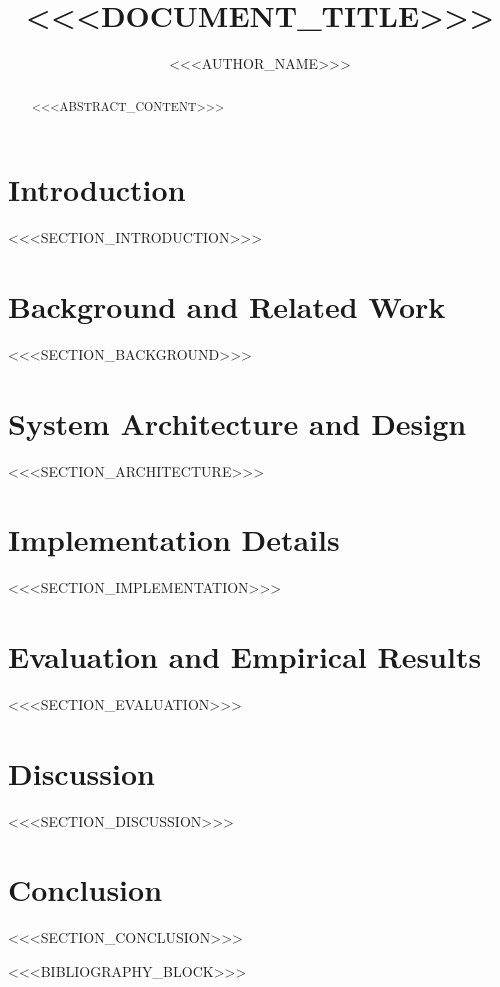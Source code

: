 \documentclass[sigconf,nonacm]{acmart}
\begin{document}
\title{<<<DOCUMENT_TITLE>>>}

\author{<<<AUTHOR_NAME>>>}

\begin{abstract}
<<<ABSTRACT_CONTENT>>>
\end{abstract}


\maketitle

\section{Introduction}
<<<SECTION_INTRODUCTION>>>

\section{Background and Related Work}
<<<SECTION_BACKGROUND>>>

\section{System Architecture and Design}
<<<SECTION_ARCHITECTURE>>>

\section{Implementation Details}
<<<SECTION_IMPLEMENTATION>>>

\section{Evaluation and Empirical Results}
<<<SECTION_EVALUATION>>>

\section{Discussion}
<<<SECTION_DISCUSSION>>>

\section{Conclusion}
<<<SECTION_CONCLUSION>>>

<<<BIBLIOGRAPHY_BLOCK>>>
\end{document}
